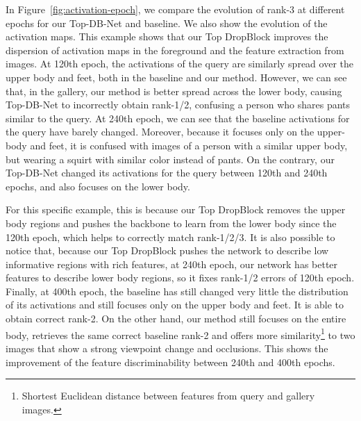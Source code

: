 \documentclass[a4paper,conference]{IEEEtran}
\begin{document}
In Figure~\ref{fig:activation-epoch}, we compare the evolution of rank-3 at different epochs for our Top-DB-Net and baseline. We also show the evolution of the activation maps. This example shows that our Top DropBlock improves the dispersion of activation maps in the foreground and the feature extraction from images. At 120th epoch, the activations of the query are similarly spread over the upper body and feet, both in the baseline and our method. However, we can see that, in the gallery, our method is better spread across the lower body, causing Top-DB-Net to incorrectly obtain rank-1/2, confusing a person who shares pants similar to the query. At 240th epoch, we can see that the baseline activations for the query have barely changed. Moreover, because it focuses only on the upper-body and feet, it is confused with images of a person with a similar upper body, but wearing a squirt with similar color instead of pants. On the contrary, our Top-DB-Net changed its activations for the query between 120th and 240th epochs, and also focuses on the lower body.

For this specific example, this is because our Top DropBlock removes the upper body regions and pushes the backbone to learn from the lower body since the 120th epoch, which helps to correctly match rank-1/2/3. It is also possible to notice that, because our Top DropBlock pushes the network to describe low informative regions with rich features, at 240th epoch, our network has better features to describe lower body regions, so it fixes rank-1/2 errors of 120th epoch. Finally, at 400th epoch, the baseline has still changed very little the distribution of its activations and still focuses only on the upper body and feet. It is able to obtain correct rank-2. On the other hand, our method still focuses on the entire body, retrieves the same correct baseline rank-2 and offers more similarity\footnote{Shortest Euclidean distance between features from query and gallery images.} to two images that show a strong viewpoint change and occlusions. This shows the improvement of the feature discriminability between 240th and 400th epochs.
\end{document}
